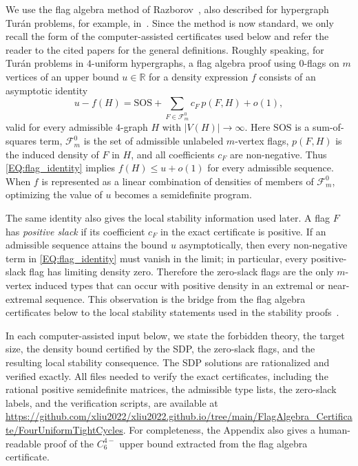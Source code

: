 \documentclass[10pt,a4paper]{article}
\theoremstyle{plain}
\theoremstyle{definition}
\begin{document}
We use the flag algebra method of Razborov~\cite{Raz07}, also described for hypergraph Tur\'an problems, for example, in~\cite{Raz10,BT11}.  Since the method is now standard, we only recall the form of the computer-assisted certificates used below and refer the reader to the cited papers for the general definitions.  Roughly speaking, for Tur\'an problems in $4$-uniform hypergraphs, a flag algebra proof using $0$-flags on $m$ vertices of an upper bound $u\in\mathbb R$ for a density expression $f$ consists of an asymptotic identity
\begin{equation}\label{EQ:flag_identity}
u-f(H)=\mathrm{SOS}+\sum_{F\in\mathcal F_m^0} c_F\,p(F,H)+o(1),
\end{equation}
valid for every admissible $4$-graph $H$ with $|V(H)|\to\infty$.  Here $\mathrm{SOS}$ is a sum-of-squares term, $\mathcal F_m^0$ is the set of admissible unlabeled $m$-vertex flags, $p(F,H)$ is the induced density of $F$ in $H$, and all coefficients $c_F$ are non-negative.  Thus \eqref{EQ:flag_identity} implies $f(H)\le u+o(1)$ for every admissible sequence.  When $f$ is represented as a linear combination of densities of members of $\mathcal F_m^0$, optimizing the value of $u$ becomes a semidefinite program.

The same identity also gives the local stability information used later.  A flag $F$ has \emph{positive slack} if its coefficient $c_F$ in the exact certificate is positive.  If an admissible sequence attains the bound $u$ asymptotically, then every non-negative term in \eqref{EQ:flag_identity} must vanish in the limit; in particular, every positive-slack flag has limiting density zero.  Therefore the zero-slack flags are the only $m$-vertex induced types that can occur with positive density in an extremal or near-extremal sequence.  This observation is the bridge from the flag algebra certificates below to the local stability statements used in the stability proofs~\cite{PikhurkoSliacanTyros19}.

In each computer-assisted input below, we state the forbidden theory, the target size, the density bound certified by the SDP, the zero-slack flags, and the resulting local stability consequence.  The SDP solutions are rationalized and verified exactly.
All files needed to verify the exact certificates, including the rational positive semidefinite matrices, the admissible type lists, the zero-slack labels, and the verification scripts, are available at
\url{https://github.com/xliu2022/xliu2022.github.io/tree/main/FlagAlgebra_Certificate/FourUniformTightCycles}.
For completeness, the Appendix also gives a human-readable proof of the $C_6^{4-}$ upper bound extracted from the flag algebra certificate.
\end{document}
